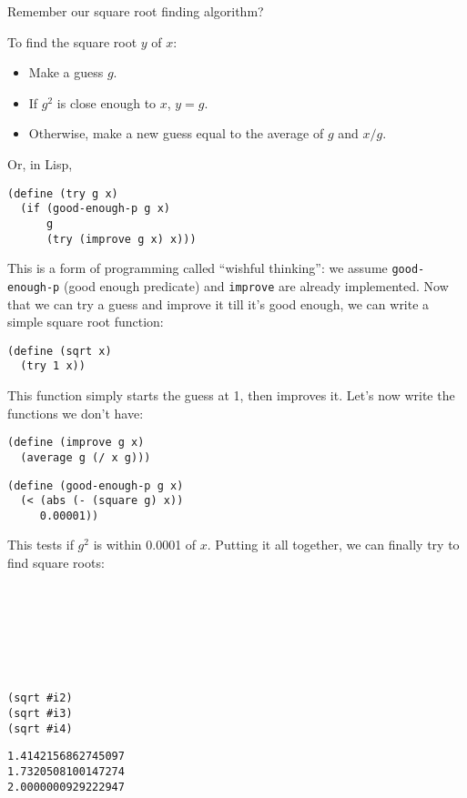 \documentclass[9pt]{report}
\begin{document}
Remember our square root finding algorithm?

To find the square root \(y\) of \(x\):
\begin{itemize}
\item Make a guess \(g\).
\item If \(g^2\) is close enough to \(x\), \(y=g\).
\item Otherwise, make a new guess equal to the average of \(g\) and
\(x/g\).
\end{itemize}

Or, in Lisp,

\begin{verbatim}
(define (try g x)
  (if (good-enough-p g x)
      g
      (try (improve g x) x)))
\end{verbatim}

This is a form of programming called ``wishful thinking'': we assume
\texttt{good-enough-p} (good enough predicate) and \texttt{improve} are already
implemented. Now that we can try a guess and improve it till it's
good enough, we can write a simple square root function:

\begin{verbatim}
(define (sqrt x)
  (try 1 x))
\end{verbatim}

This function simply starts the guess at 1, then improves it. Let's
now write the functions we don't have:

\begin{verbatim}
(define (improve g x)
  (average g (/ x g)))
\end{verbatim}

\begin{verbatim}
(define (good-enough-p g x)
  (< (abs (- (square g) x))
     0.00001))
\end{verbatim}

This tests if \(g^2\) is within 0.0001 of \(x\). Putting it all
together, we can finally try to find square roots:

\begin{verbatim}







(sqrt #i2)
(sqrt #i3)
(sqrt #i4)
\end{verbatim}

\begin{verbatim}
1.4142156862745097
1.7320508100147274
2.0000000929222947
\end{verbatim}
\end{document}
